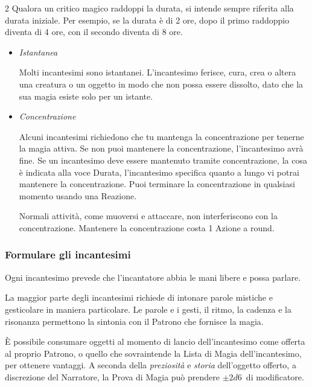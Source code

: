 \begin{multicols}{2}
Qualora un critico magico raddoppi la durata, si intende sempre riferita alla durata iniziale. Per esempio, se la durata è di 2 ore, dopo il primo raddoppio diventa di 4 ore, con il secondo diventa di 8 ore.

\begin{itemize}[leftmargin=*] \setlength{\itemsep}{0pt}

\item
\emph{Istantanea}

Molti incantesimi sono istantanei. L'incantesimo ferisce, cura, crea o altera una creatura o un oggetto in modo che non possa essere dissolto, dato che la sua magia esiste solo per un istante.

\item

\emph{Concentrazione}

Alcuni incantesimi richiedono che tu mantenga la concentrazione per tenerne la magia attiva. Se non puoi mantenere la concentrazione, l'incantesimo avrà fine. Se un incantesimo deve essere mantenuto tramite concentrazione, la cosa è indicata alla voce Durata, l'incantesimo specifica quanto a lungo vi potrai mantenere la concentrazione. Puoi terminare la concentrazione in qualsiasi momento usando una Reazione.

Normali attività, come muoversi e attaccare, non interferiscono con la concentrazione. Mantenere la concentrazione costa 1 Azione a round.
\end{itemize}

\subsubsection{Formulare gli incantesimi}\label{magiecomponenti}

Ogni incantesimo prevede che l'incantatore abbia le mani libere e possa parlare.

La maggior parte degli incantesimi richiede di intonare parole mistiche e gesticolare in maniera particolare. Le parole e i gesti, il ritmo, la cadenza e la risonanza permettono la sintonia con il Patrono che fornisce la magia.

È possibile consumare oggetti al momento di lancio dell'incantesimo come offerta al proprio Patrono, o quello che sovraintende la Lista di Magia dell'incantesimo, per ottenere vantaggi. A seconda della \emph{preziosità} e \emph{storia} dell'oggetto offerto, a discrezione del Narratore, la Prova di Magia può prendere $\pm2d6$\ di modificatore.


\end{multicols}
